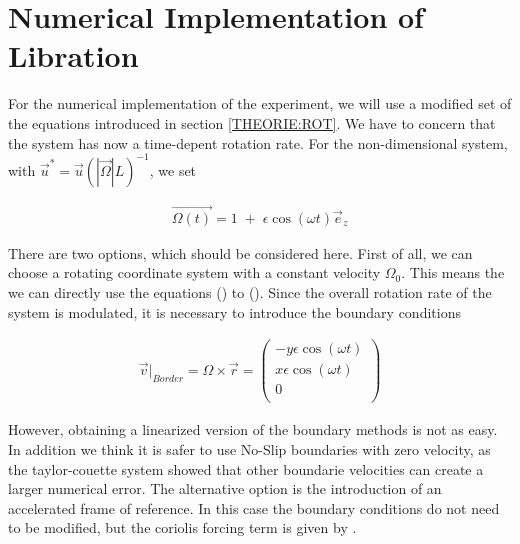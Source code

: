 \section{Numerical Implementation of Libration}

For the numerical implementation of the experiment, we will use a modified set of the equations
introduced in section \ref{THEORIE:ROT}.
We have to concern that the system has now a time-depent rotation rate.
For the non-dimensional system, with $\vec{u}^* =  \vec{u} (|\vec{\Omega}|L)^{-1}$, we set

\begin{align}
    \vec{\Omega(t)} = 1 \; + \; \epsilon \cos(\omega t)\vec{e}_z
\end{align}

There are two options, which should be considered here.
First of all, we can choose a rotating coordinate system with a constant velocity $\Omega_0$.
This means the we can directly use the equations () to (). Since the overall rotation rate of the system is
modulated, it is necessary to introduce the boundary conditions

\begin{align}
    \vec{v}|_{Border}  = \Omega \times \vec{r} = \begin{pmatrix}
           -y \epsilon \cos(\omega t) \\
           x \epsilon \cos(\omega t) \\
           0\\
         \end{pmatrix}
\end{align}

However, obtaining a linearized version of the boundary methods is not as easy.
In addition we think it is safer to use No-Slip boundaries with zero velocity, as
the taylor-couette system showed that other boundarie velocities can create a larger numerical error.
The alternative option is the introduction of an accelerated frame of reference.
In this case the boundary conditions do not need to be modified, but the coriolis forcing term is given by \citep{Tilgner2007}.

